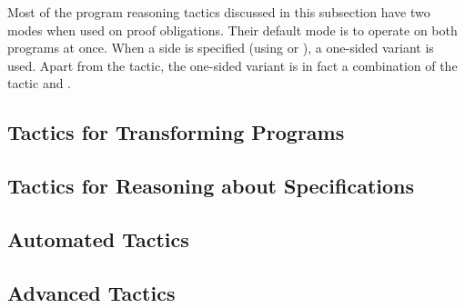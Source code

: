 Most of the program reasoning tactics discussed in this subsection
have two modes when used on \prhl proof obligations. Their default
mode is to operate on both programs at once. When a side is specified
(using  or ), a one-sided variant
is used. Apart from the  tactic, the one-sided variant is
in fact a combination of the \phl tactic and .

\medskip











\subsection{Tactics for Transforming Programs}
\label{subsec:transformingprograms}

















\subsection{Tactics for Reasoning about Specifications}














\subsection{Automated Tactics}
\label{subsec:automatedtactics}




\subsection{Advanced Tactics}
\label{subsec:advancedtactics}



